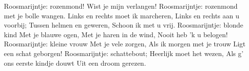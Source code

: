 \beginverse*
Roosmarijntje: rozenmond!
Wist je mijn verlangen!
Roosmarijntje: rozenmond
met je bolle wangen.
\endverse
\beginchorus
Links en rechts moet ik marcheren,
Links en rechts aan u voorbij;
Tussen helmen en geweren,
Schoon ik met u vrij.
\endchorus
\beginverse*
Roosmarijntje: blonde kind
Met je blauwe ogen,
Met je haren in de wind,
Nooit heb 'k u belogen!
\endverse
\beginverse*
Roosmarijntje: kleine vrouw
Met je vele zorgen,
Als ik morgen met je trouw
Ligt een schat geborgen!
\endverse
\beginverse*
Roosmarijntje: schattebout;
Heerlijk moet het wezen,
Als g’ ons eerste kindje douwt
Uit een droom gerezen. 
\endverse
\endsong